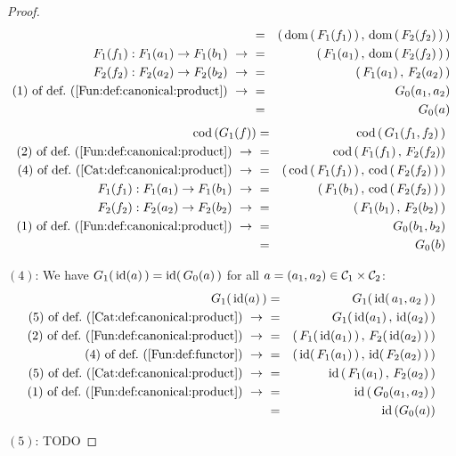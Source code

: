 \begin{proof}
\begin{eqnarray*}
            &=&(\,\dom\,(\,F_{1}(f_{1})\,)\,,\,\dom\,(\,F_{2}(f_{2})\,)\,)\\
            F_{1}(f_{1}):F_{1}(a_{1})\to F_{1}(b_{1})\ \to\ 
            &=&(\,F_{1}(a_{1})\,,\,\dom\,(\,F_{2}(f_{2})\,)\,)\\
            F_{2}(f_{2}):F_{2}(a_{2})\to F_{2}(b_{2})\ \to\ 
            &=&(\,F_{1}(a_{1})\,,\,F_{2}(a_{2})\,)\\
            \mbox{$(1)$ of def.~(\ref{Fun:def:canonical:product})}\ \to\ 
            &=&G_{0}(a_{1},a_{2})\\
            &=&G_{0}(a)
        \end{eqnarray*}
        \begin{eqnarray*}\cod\,(G_{1}(f))
            &=& \cod\,(\,G_{1}(f_{1},f_{2})\,)\\
            \mbox{$(2)$ of def.~(\ref{Fun:def:canonical:product})}\ \to\ 
            &=&\cod\,(\,F_{1}(f_{1})\,,\,F_{2}(f_{2}))\\
            \mbox{$(4)$ of def.~(\ref{Cat:def:canonical:product})}\ \to\ 
            &=&(\,\cod\,(\,F_{1}(f_{1})\,)\,,\,\cod\,(\,F_{2}(f_{2})\,)\,)\\
            F_{1}(f_{1}):F_{1}(a_{1})\to F_{1}(b_{1})\ \to\ 
            &=&(\,F_{1}(b_{1})\,,\,\cod\,(\,F_{2}(f_{2})\,)\,)\\
            F_{2}(f_{2}):F_{2}(a_{2})\to F_{2}(b_{2})\ \to\ 
            &=&(\,F_{1}(b_{1})\,,\,F_{2}(b_{2})\,)\\
            \mbox{$(1)$ of def.~(\ref{Fun:def:canonical:product})}\ \to\ 
            &=&G_{0}(b_{1},b_{2})\\
            &=&G_{0}(b)
        \end{eqnarray*}

    $(4)$: We have $G_{1}(\,\mbox{\rm id}(a)\,)=\mbox{\rm id}(\,G_{0}(a)\,)$ for all $a=(a_{1},a_{2})
    \in\mbox{${\cal C}_{1}$}\times\mbox{${\cal C}_{2}$}$:
        \begin{eqnarray*}G_{1}(\,\id(a)\,)
            &=&G_{1}(\,\id(\,a_{1},a_{2}\,)\,)\\
            \mbox{$(5)$ of def.~(\ref{Cat:def:canonical:product})}\ \to\ 
            &=&G_{1}(\,\id(a_{1})\,,\,\id(a_{2})\,)\\
            \mbox{$(2)$ of def.~(\ref{Fun:def:canonical:product})}\ \to\ 
            &=&(\,F_{1}(\,\id(a_{1})\,)\,,\,F_{2}(\,\id(a_{2})\,)\,)\\
            \mbox{$(4)$ of def.~(\ref{Fun:def:functor})}\ \to\ 
            &=&(\,\id(\,F_{1}(a_{1})\,)\,,\,\id(\,F_{2}(a_{2})\,)\,)\\
            \mbox{$(5)$ of def.~(\ref{Cat:def:canonical:product})}\ \to\ 
            &=&\id\,(\,F_{1}(a_{1})\,,\,F_{2}(a_{2})\,)\\
            \mbox{$(1)$ of def.~(\ref{Fun:def:canonical:product})}\ \to\ 
            &=&\id\,(\,G_{0}(a_{1},a_{2})\,)\\
            &=&\id\,(G_{0}(a))
        \end{eqnarray*}

    $(5)$: TODO
\end{proof}
